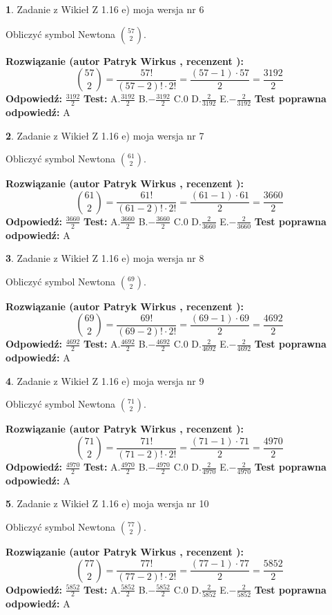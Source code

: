 \documentclass[12pt, a4paper]{article}
\theoremstyle{definition} %
\newtheorem{zad}{}
\newcommand{\zadStart}[1]{\begin{zad}#1\newline}
\newcommand{\zadStop}{\end{zad}}
\newcommand{\rozwStart}[2]{\noindent \textbf{Rozwiązanie (autor #1 , recenzent #2): }\newline}
\newcommand{\rozwStop}{\newline}
\newcommand{\odpStart}{\noindent \textbf{Odpowiedź:}\newline}
\newcommand{\odpStop}{\newline}
\newcommand{\testStart}{\noindent \textbf{Test:}\newline}
\newcommand{\testStop}{\newline}
\newcommand{\kluczStart}{\noindent \textbf{Test poprawna odpowiedź:}\newline}
\newcommand{\kluczStop}{\newline}
\begin{document}
\zadStart{Zadanie z Wikieł Z 1.16 e) moja wersja nr 6}

Obliczyć symbol Newtona ${57 \choose 2}$.
\zadStop
\rozwStart{Patryk Wirkus}{}
$${57 \choose 2} = \frac{57!}{(57-2)! \cdot 2!} = \frac{(57-1) \cdot 57}{2} = \frac{3192}{2}$$
\rozwStop
\odpStart
$\frac{3192}{2}$
\odpStop
\testStart
A.$\frac{3192}{2}$ B.$-\frac{3192}{2}$ C.$0$ D.$\frac{2}{3192}$ E.$-\frac{2}{3192}$
\testStop
\kluczStart
A
\kluczStop



\zadStart{Zadanie z Wikieł Z 1.16 e) moja wersja nr 7}

Obliczyć symbol Newtona ${61 \choose 2}$.
\zadStop
\rozwStart{Patryk Wirkus}{}
$${61 \choose 2} = \frac{61!}{(61-2)! \cdot 2!} = \frac{(61-1) \cdot 61}{2} = \frac{3660}{2}$$
\rozwStop
\odpStart
$\frac{3660}{2}$
\odpStop
\testStart
A.$\frac{3660}{2}$ B.$-\frac{3660}{2}$ C.$0$ D.$\frac{2}{3660}$ E.$-\frac{2}{3660}$
\testStop
\kluczStart
A
\kluczStop



\zadStart{Zadanie z Wikieł Z 1.16 e) moja wersja nr 8}

Obliczyć symbol Newtona ${69 \choose 2}$.
\zadStop
\rozwStart{Patryk Wirkus}{}
$${69 \choose 2} = \frac{69!}{(69-2)! \cdot 2!} = \frac{(69-1) \cdot 69}{2} = \frac{4692}{2}$$
\rozwStop
\odpStart
$\frac{4692}{2}$
\odpStop
\testStart
A.$\frac{4692}{2}$ B.$-\frac{4692}{2}$ C.$0$ D.$\frac{2}{4692}$ E.$-\frac{2}{4692}$
\testStop
\kluczStart
A
\kluczStop



\zadStart{Zadanie z Wikieł Z 1.16 e) moja wersja nr 9}

Obliczyć symbol Newtona ${71 \choose 2}$.
\zadStop
\rozwStart{Patryk Wirkus}{}
$${71 \choose 2} = \frac{71!}{(71-2)! \cdot 2!} = \frac{(71-1) \cdot 71}{2} = \frac{4970}{2}$$
\rozwStop
\odpStart
$\frac{4970}{2}$
\odpStop
\testStart
A.$\frac{4970}{2}$ B.$-\frac{4970}{2}$ C.$0$ D.$\frac{2}{4970}$ E.$-\frac{2}{4970}$
\testStop
\kluczStart
A
\kluczStop



\zadStart{Zadanie z Wikieł Z 1.16 e) moja wersja nr 10}

Obliczyć symbol Newtona ${77 \choose 2}$.
\zadStop
\rozwStart{Patryk Wirkus}{}
$${77 \choose 2} = \frac{77!}{(77-2)! \cdot 2!} = \frac{(77-1) \cdot 77}{2} = \frac{5852}{2}$$
\rozwStop
\odpStart
$\frac{5852}{2}$
\odpStop
\testStart
A.$\frac{5852}{2}$ B.$-\frac{5852}{2}$ C.$0$ D.$\frac{2}{5852}$ E.$-\frac{2}{5852}$
\testStop
\kluczStart
A
\kluczStop
\end{document}
